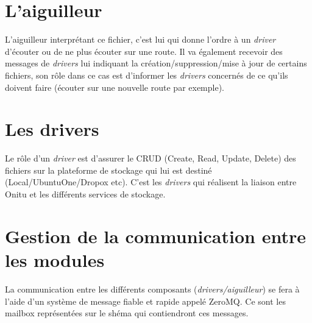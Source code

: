 \section{L'aiguilleur}
L'aiguilleur interprétant ce fichier, c'est lui qui donne l'ordre à un \emph{driver} d'écouter ou de ne plus écouter sur une route.
Il va également recevoir des messages de \emph{drivers} lui indiquant la création/suppression/mise à jour de certains fichiers, son rôle dans ce cas est d'informer les \emph{drivers} concernés de ce qu'ils doivent faire (écouter sur une nouvelle route par exemple).


\section{Les drivers}
Le rôle d'un \emph{driver} est d'assurer le CRUD (Create, Read, Update, Delete) des fichiers sur la plateforme de stockage qui lui est destiné (Local/UbuntuOne/Dropox etc).
C'est les \emph{drivers} qui réalisent la liaison entre Onitu et les différents services de stockage.


\section{Gestion de la communication entre les modules}
La communication entre les différents composants (\emph{drivers/aiguilleur}) se fera à l'aide d'un système de message fiable et rapide appelé ZeroMQ. Ce sont les mailbox représentées sur le shéma qui contiendront ces messages.
